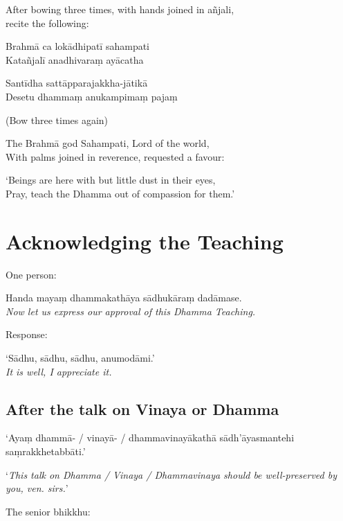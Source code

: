 \begin{instruction}
  After bowing three times, with hands joined in añjali,\\
  recite the following:
\end{instruction}

Brahmā ca lokādhipatī sahampati\\
Katañjalī anadhivaraṃ ayācatha

Santīdha sattāpparajakkha-jātikā\\
Desetu dhammaṃ anukampimaṃ pajaṃ

\ifhandbookedition
\enlargethispage{\baselineskip}
\fi

\begin{instruction}
  (Bow three times again)
\end{instruction}

\begin{english}
The Brahmā god Sahampati, Lord of the world,\\
With palms joined in reverence, requested a favour:

`Beings are here with but little dust in their eyes,\\
Pray, teach the Dhamma out of compassion for them.'
\end{english}


\section{Acknowledging the Teaching}

One person:

Handa mayaṃ dhammakathāya sādhukāraṃ dadāmase.\\
\emph{Now let us express our approval of this Dhamma Teaching.}

Response:

‘Sādhu, sādhu, sādhu, anumodāmi.’\\
\emph{It is well, I appreciate it.}

\subsection{After the talk on Vinaya or Dhamma}

‘Ayaṃ dhammā- / vinayā- / dhammavinayākathā sādh'āyasmantehi saṃrakkhetabbāti.’

‘\emph{This talk on Dhamma / Vinaya / Dhammavinaya should be well-preserved by you, ven. sirs.}’

The senior bhikkhu:

